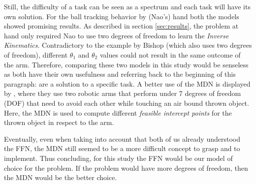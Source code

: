 \documentclass{article}
\begin{document}
    Still, the difficulty of a task can be seen as a spectrum and each task will have its own solution. 
    For the ball tracking behavior by (Nao's) hand both the models showed promising results. 
    As described in section \ref{sec:results}, the problem at hand only required Nao to use two degrees of freedom to learn the \textit{Inverse Kinematics}.
    Contradictory to the example by Bishop\cite{bishop1994mixture} (which also uses two degrees of freedom), different $\theta_1$ and $\theta_2$ values could not result in the same outcome of the arm.
    Therefore, comparing these two models in this study would be senseless as both have their own usefulness and referring back to the beginning of this paragraph: are a solution to a specific task.
    A better use of the MDN is displayed by \cite{mirrazavi2018unified}, where they use two robotic arms that perform under 7 degrees of freedom (DOF) that need to avoid each other while touching an air bound thrown object.
    Here, the MDN is used to compute different \textit{feasible intercept points} for the thrown object in respect to the arm.

    Eventually, even when taking into account that both of us already understood the FFN, the MDN still seemed to be a more difficult concept to grasp and to implement.
    Thus concluding, for this study the FFN would be our model of choice for the problem.
    If the problem would have more degrees of freedom, then the MDN would be the better choice.




    \pagebreak
    
    
\end{document}
